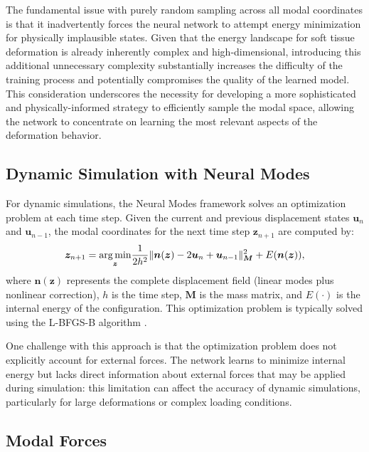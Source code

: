 The fundamental issue with purely random sampling across all modal coordinates is that it inadvertently forces the neural network to attempt energy minimization for physically implausible states. Given that the energy landscape for soft tissue deformation is already inherently complex and high-dimensional, introducing this additional unnecessary complexity substantially increases the difficulty of the training process and potentially compromises the quality of the learned model. This consideration underscores the necessity for developing a more sophisticated and physically-informed strategy to efficiently sample the modal space, allowing the network to concentrate on learning the most relevant aspects of the deformation behavior.


\subsection{Dynamic Simulation with Neural Modes}
\label{sec:subspace_dynamics}
For dynamic simulations, the Neural Modes framework solves an optimization problem at each time step. Given the current and previous displacement states $\bm{u}_n$ and $\bm{u}_{n-1}$, the modal coordinates for the next time step $\bm{z}_{n+1}$ are computed by:
\begin{equation}
    \bm{z}_{n+1} = \underset{\bm{z}}{\operatorname*{arg\,min}} \frac{1}{2h^2} \|\bm{n}(\bm{z}) - 2\bm{u}_n + \bm{u}_{n-1}\|_{\bm{M}}^2 + E(\bm{n}(\bm{z})),
    \label{eq:optimization_problem}
\end{equation}
where $\bm{n}(\bm{z})$ represents the complete displacement field (linear modes plus nonlinear correction), $h$ is the time step, $\bm{M}$ is the mass matrix, and $E(\cdot)$ is the internal energy of the configuration. This optimization problem is typically solved using the L-BFGS-B algorithm \cite{Liu_1989}.

One challenge with this approach is that the optimization problem does not explicitly account for external forces. The network learns to minimize internal energy but lacks direct information about external forces that may be applied during simulation: this limitation can affect the accuracy of dynamic simulations, particularly for large deformations or complex loading conditions.



\subsection{Modal Forces}
\label{sec:modal_forces}

